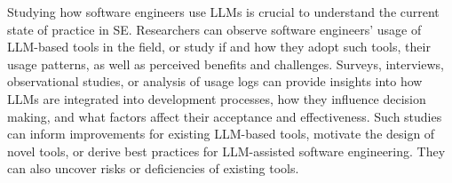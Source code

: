 \label{sec:studying-llm-usage-in-software-engineering}


Studying how software engineers use LLMs is crucial to understand the current state of practice in SE.
Researchers can observe software engineers' usage of LLM-based tools in the field, or study if and how they adopt such tools, their usage patterns, as well as perceived benefits and challenges.
Surveys, interviews, observational studies, or analysis of usage logs can provide insights into how LLMs are integrated into development processes, how they influence decision making, and what factors affect their acceptance and effectiveness. 
Such studies can inform improvements for existing LLM-based tools, motivate the design of novel tools, or derive best practices for LLM-assisted software engineering.
They can also uncover risks or deficiencies of existing tools.


